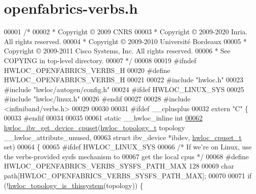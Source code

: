 \hypertarget{a00167_source}{}\section{openfabrics-\/verbs.h}
\label{a00167_source}

\begin{DoxyCode}
00001 \textcolor{comment}{/*}
00002 \textcolor{comment}{ * Copyright © 2009 CNRS}
00003 \textcolor{comment}{ * Copyright © 2009-2020 Inria.  All rights reserved.}
00004 \textcolor{comment}{ * Copyright © 2009-2010 Université Bordeaux}
00005 \textcolor{comment}{ * Copyright © 2009-2011 Cisco Systems, Inc.  All rights reserved.}
00006 \textcolor{comment}{ * See COPYING in top-level directory.}
00007 \textcolor{comment}{ */}
00008 
00019 \textcolor{preprocessor}{#ifndef HWLOC\_OPENFABRICS\_VERBS\_H}
00020 \textcolor{preprocessor}{#define HWLOC\_OPENFABRICS\_VERBS\_H}
00021 
00022 \textcolor{preprocessor}{#include "hwloc.h"}
00023 \textcolor{preprocessor}{#include "hwloc/autogen/config.h"}
00024 \textcolor{preprocessor}{#ifdef HWLOC\_LINUX\_SYS}
00025 \textcolor{preprocessor}{#include "hwloc/linux.h"}
00026 \textcolor{preprocessor}{#endif}
00027 
00028 \textcolor{preprocessor}{#include <infiniband/verbs.h>}
00029 
00030 
00031 \textcolor{preprocessor}{#ifdef \_\_cplusplus}
00032 \textcolor{keyword}{extern} \textcolor{stringliteral}{"C"} \{
00033 \textcolor{preprocessor}{#endif}
00034 
00035 
00061 \textcolor{keyword}{static} \_\_hwloc\_inline \textcolor{keywordtype}{int}
\hyperlink{a00224_ga3ea0d838c1e7f1671b35687aae2da6ae}{00062} \hyperlink{a00224_ga3ea0d838c1e7f1671b35687aae2da6ae}{hwloc\_ibv\_get\_device\_cpuset}(\hyperlink{a00186_ga9d1e76ee15a7dee158b786c30b6a6e38}{hwloc\_topology\_t} topology 
      \_\_hwloc\_attribute\_unused,
00063                             \textcolor{keyword}{struct} ibv\_device *ibdev, \hyperlink{a00183_ga4bbf39b68b6f568fb92739e7c0ea7801}{hwloc\_cpuset\_t} \textcolor{keyword}{set})
00064 \{
00065 \textcolor{preprocessor}{#ifdef HWLOC\_LINUX\_SYS}
00066   \textcolor{comment}{/* If we're on Linux, use the verbs-provided sysfs mechanism to}
00067 \textcolor{comment}{     get the local cpus */}
00068 \textcolor{preprocessor}{#define HWLOC\_OPENFABRICS\_VERBS\_SYSFS\_PATH\_MAX 128}
00069   \textcolor{keywordtype}{char} path[HWLOC\_OPENFABRICS\_VERBS\_SYSFS\_PATH\_MAX];
00070 
00071   \textcolor{keywordflow}{if} (!\hyperlink{a00193_ga68ffdcfd9175cdf40709801092f18017}{hwloc\_topology\_is\_thissystem}(topology)) \{

\end{DoxyCode}
